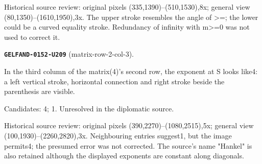 Historical source review: original pixels (335,1390)–(510,1530),8x; general view (80,1350)–(1610,1950),3x. The upper stroke resembles the angle of >=; the lower could be a curved equality stroke. Redundancy of infinity with m>=0 was not used to correct it.\par\medskip
\par\noindent\leavevmode{}\label{GELFAND-0152-U209}\textbf{\texttt{GELFAND-0152-U209}} (matrix-row-2-col-3).\nopagebreak[4]\par
In the third column of the matrix(4)'s second row, the exponent at S looks like4: a left vertical stroke, horizontal connection and right stroke beside the parenthesis are visible.\par
Candidates: 4; 1. Unresolved in the diplomatic source.\par
Historical source review: original pixels (390,2270)–(1080,2515),5x; general view (100,1930)–(2260,2820),3x. Neighbouring entries suggest1, but the image permits4; the presumed error was not corrected. The source's name "Hankel" is also retained although the displayed exponents are constant along diagonals.\par\medskip
